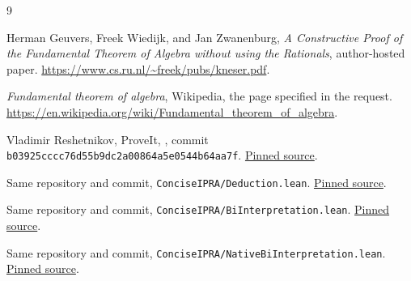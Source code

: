 \documentclass[11pt,letterpaper]{article}
\theoremstyle{definition}\newtheorem{definition}[theorem]{Definition}
\theoremstyle{remark}\newtheorem{remark}[theorem]{Remark}
\begin{document}
\begin{thebibliography}{9}
\raggedright
{}
Herman Geuvers, Freek Wiedijk, and Jan Zwanenburg,
\emph{A Constructive Proof of the Fundamental Theorem of Algebra without
using the Rationals}, author-hosted paper.
\url{https://www.cs.ru.nl/~freek/pubs/kneser.pdf}.

\emph{Fundamental theorem of algebra}, Wikipedia, the page specified in
the request.
\url{https://en.wikipedia.org/wiki/Fundamental_theorem_of_algebra}.

Vladimir Reshetnikov, ProveIt,
,
commit \texttt{b03925cccc76d55b9dc2a00864a5e0544b64aa7f}.
\href{https://github.com/VladimirReshetnikov/ProveIt/blob/b03925cccc76d55b9dc2a00864a5e0544b64aa7f/Logic/PrimitiveRecursiveArithmetic/ConciseIPRA/Lean/ConciseIPRA/PR.lean}{Pinned source}.

Same repository and commit, \texttt{ConciseIPRA/Deduction.lean}.
\href{https://github.com/VladimirReshetnikov/ProveIt/blob/b03925cccc76d55b9dc2a00864a5e0544b64aa7f/Logic/PrimitiveRecursiveArithmetic/ConciseIPRA/Lean/ConciseIPRA/Deduction.lean}{Pinned source}.

Same repository and commit, \texttt{ConciseIPRA/BiInterpretation.lean}.
\href{https://github.com/VladimirReshetnikov/ProveIt/blob/b03925cccc76d55b9dc2a00864a5e0544b64aa7f/Logic/PrimitiveRecursiveArithmetic/ConciseIPRA/Lean/ConciseIPRA/BiInterpretation.lean}{Pinned source}.

Same repository and commit, \texttt{ConciseIPRA/NativeBiInterpretation.lean}.
\href{https://github.com/VladimirReshetnikov/ProveIt/blob/b03925cccc76d55b9dc2a00864a5e0544b64aa7f/Logic/PrimitiveRecursiveArithmetic/ConciseIPRA/Lean/ConciseIPRA/NativeBiInterpretation.lean}{Pinned source}.
\end{thebibliography}
\end{document}
